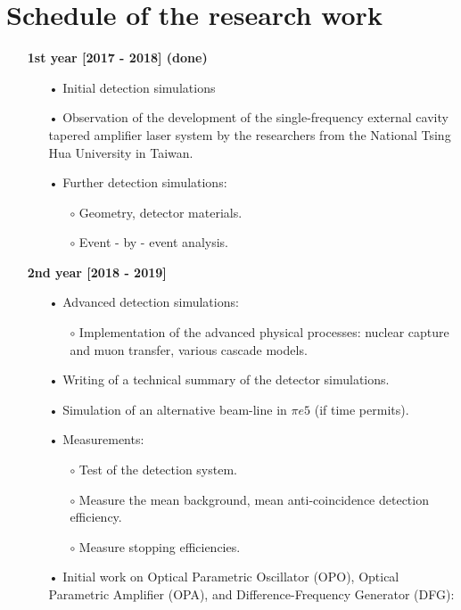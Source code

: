 \documentclass[12pt]{article}
\begin{document}
\section{Schedule of the research work}
\begin{itemize}
\item[]
\textbf{1st year [2017 - 2018] (done)}
\begin{itemize}
\item[•]
	Initial detection simulations
\item[•]
	Observation of the development of the single-frequency external cavity tapered amplifier laser system by the researchers from the National Tsing Hua University in Taiwan. 	
\item[•]
	Further detection simulations:
	\begin{itemize}
		\item[$\circ$]
		Geometry, detector materials.
		\item[$\circ$]
		Event - by - event analysis.	
	\end{itemize}
\end{itemize}
\item[]
\textbf{2nd year [2018 - 2019]}
\begin{itemize}
\item[•]	
    Advanced detection simulations:
    \begin{itemize}
    		\item[$\circ$]
    		Implementation of the advanced physical processes: nuclear capture and muon transfer, various cascade models.
    \end{itemize}
\item[•]
    Writing of a technical summary of the detector simulations. 
\item[•]
	Simulation of an alternative beam-line in $\pi{e}5$ (if time permits).	 
\item[•]
    Measurements:
    \begin{itemize}
    \item[$\circ$]
	Test of the detection system.
	\item[$\circ$]
    Measure the mean background, mean anti-coincidence detection efficiency.
	\item[$\circ$]
	Measure stopping efficiencies.
	\end{itemize}
\item[•]
	Initial work on Optical Parametric Oscillator (OPO), Optical Parametric Amplifier (OPA), and Difference-Frequency Generator (DFG):

\end{itemize}
\end{itemize}
\end{document}

